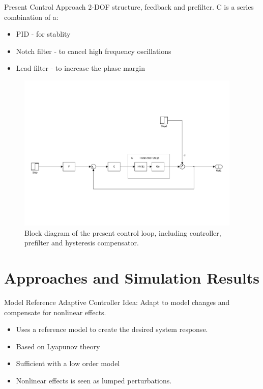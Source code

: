 \documentclass[10pt]{beamer}
\begin{document}
\begin{frame}{Present Control Approach}
  2-DOF structure, feedback and prefilter.
  C is a series combination of a:
  \begin{itemize}
    \item  \alert{PID} - for stablity
    \item  \alert{Notch filter} - to cancel high frequency oscillations
    \item  \alert{Lead filter} - to increase the phase margin
  \end{itemize}

  \begin{figure}[h!]
    \centering %
    \includegraphics[width=0.95\textwidth, trim=4cm 4cm 2.1cm 10cm, clip=true]{../fig/matlab/present_controller}
    \caption{\label{fig:present}Block diagram of the present control loop, including controller, prefilter and hysteresis compensator.}
  \end{figure}
\end{frame}

\section{Approaches and Simulation Results}

\begin{frame}{Model Reference Adaptive Controller}
  \alert{Idea}: Adapt to model changes and compensate for nonlinear effects.
  \begin{itemize}
    \item Uses a reference model to create the desired system response.
    \item Based on Lyapunov theory
    \item Sufficient with a low order model
    \item Nonlinear effects is seen as lumped perturbations.

  \end{itemize}
\end{frame}
\end{document}
